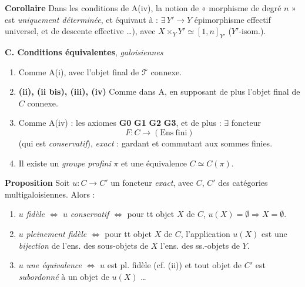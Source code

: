 \documentclass[11pt,a4paper]{article}
\begin{document}

\textbf{Corollaire} \quad Dans les conditions de A(iv), la notion de
« morphisme de degré $n$ » est \emph{uniquement déterminée}, et
 équivaut à : $\exists\, Y' \longrightarrow Y$
épimorphisme \struck{\ill{}} effectif universel, et de descente effective
\ldots), avec $X \times_Y Y' \simeq [1, n]_{Y'}$ ($Y'$-isom.).


\textbf{C. Conditions équivalentes}, \ill{} \emph{galoisiennes}

\begin{enumerate}
\item[(i)] Comme A(i), avec l'objet final de $\mathcal{T}$ connexe.

\item[] \textbf{(ii), (ii bis), (iii), (iv)} Comme dans A, en supposant de plus l'objet
final \ill{} de $C$ connexe.

\item[(v)] Comme A(iv) : les axiomes \textbf{G0} \textbf{G1} \textbf{G2}
\textbf{G3}, et de plus : $\exists$ foncteur 
\[
  F : C \longrightarrow (\mathrm{Ens\ fini})
\]
(qui est \emph{conservatif}), \emph{exact} : gardant et commutant aux sommes
finies.

\item[(vi)] \struck{\ill{}} Il existe un \emph{groupe profini} $\pi$ et une
équivalence $C \simeq C(\pi)$.
\end{enumerate}


\textbf{Proposition} \quad Soit $u : C \longrightarrow C'$ un foncteur
\emph{exact}, avec $C$, $C'$ des catégories multigaloisiennes. Alors :

\begin{enumerate}
\item[(i)] $u$ \emph{fidèle} $\Longleftrightarrow$ $u$ \emph{conservatif}
$\Longleftrightarrow$ pour tt objet $X$ de $C$,
$u(X) = \emptyset \Longrightarrow X = \emptyset$.

\item[(ii)] $u$ \emph{pleinement fidèle} $\Longleftrightarrow$ pour tt objet
$X$ de $C$,  l'application \struck{\ill{}} \ill{}
 $u(X)$ est une \emph{bijection} de l'ens. des sous-objets de $X$
 l'ens. des ss.-objets de $Y$.

\item[(iii)] $u$ \emph{une équivalence} $\Longleftrightarrow$ $u$ est pl.
fidèle (cf. (ii)) et tout objet de $C'$ est \emph{subordonné} à un objet de
\ill{} $u(X)$ \ldots
\end{enumerate}


\end{document}
